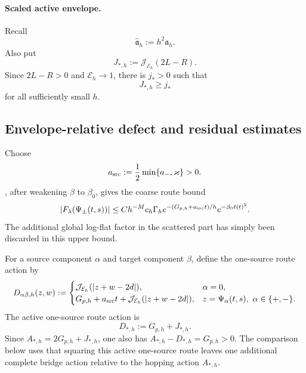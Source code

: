 \documentclass[11pt]{article}
\newcommand{\cE}{\mathcal E}
\newcommand{\cJ}{\mathcal J}
\begin{document}
\paragraph{Scaled active envelope.}
Recall
\begin{equation}\label{eq:scaled-envelope}
 \widehat{\mathfrak a}_h:=h^2\mathfrak a_h.
\end{equation}
Also put
\begin{equation}\label{eq:Jstar-positive}
 J_{*,h}:=\cJ_{\cE_h}(2L-R).
\end{equation}
Since $2L-R>0$ and $\cE_h\to1$, there is
$j_*>0$ such that
\begin{equation}\label{eq:Jstar-lower}
 J_{*,h}\ge j_*
\end{equation}
for all sufficiently small $h$.

\subsection{Envelope-relative defect and residual estimates}
\label{sec:defect-residual}
Choose
\begin{equation}\label{eq:asrc}
 a_{\rm src}:=\frac12\min\{a_-,\varkappa\}>0.
\end{equation}
, after weakening $\beta$ to $\beta_0$, gives the
coarse route bound
\begin{equation}\label{eq:cusp-source-route-bound}
 |F_\lambda(\Psi_\pm(t,s))|
 \le C h^{-M}c_h\Gamma_h
 e^{-(G_{p,h}+a_{\rm src}t)/h}e^{-\beta_0\ell(t)^2}.
\end{equation}
The additional global log-flat factor in the scattered part has simply been
discarded in this upper bound.

For a source component $\alpha$ and target component $\beta$, define the
one-source route action by
\begin{equation}\label{eq:joint-route-action}
 D_{\alpha\beta,h}(z,w)
 :=\begin{cases}
 \cJ_{\cE_h}(|z+w-2d|),&\alpha=0,\\
 G_{p,h}+a_{\rm src}t+\cJ_{\cE_h}(|z+w-2d|),
 &z=\Psi_\alpha(t,s),\ \alpha\in\{+,-\}.
 \end{cases}
\end{equation}
The active one-source route action is
\begin{equation}\label{eq:Dstar}
 D_{*,h}:=G_{p,h}+J_{*,h}.
\end{equation}
Since $A_{*,h}=2G_{p,h}+J_{*,h}$, one also has
$A_{*,h}-D_{*,h}=G_{p,h}>0$.  The comparison below uses that squaring this
active one-source route leaves one additional complete bridge action relative
to the hopping action $A_{*,h}$.
\end{document}
